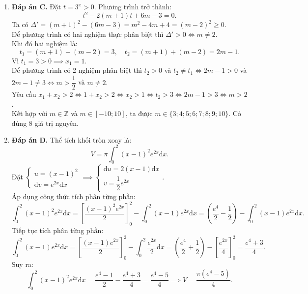 \documentclass[12pt,a4paper]{article}
\begin{document}
\begin{enumerate}[label=\textbf{Câu \arabic*:}, leftmargin=*]
\item \textbf{Đáp án C.}
Đặt $t = 3^x > 0$. Phương trình trở thành:
$$t^2 - 2(m + 1)t + 6m - 3 = 0.$$
Ta có $\Delta' = (m + 1)^2 - (6m - 3) = m^2 - 4m + 4 = (m - 2)^2 \ge 0$.\\
Để phương trình có hai nghiệm thực phân biệt thì $\Delta' > 0 \iff m \ne 2$.\\
Khi đó hai nghiệm là:
$$t_1 = (m + 1) - (m - 2) = 3,\quad t_2 = (m + 1) + (m - 2) = 2m - 1.$$
Vì $t_1 = 3 > 0 \implies x_1 = 1$.\\
Để phương trình có 2 nghiệm phân biệt thì $t_2 > 0$ và $t_2 \ne t_1 \iff 2m - 1 > 0$ và $2m - 1 \ne 3 \iff m > \dfrac{1}{2}$ và $m \ne 2$.\\
Yêu cầu $x_1 + x_2 > 2 \iff 1 + x_2 > 2 \iff x_2 > 1 \iff t_2 > 3 \iff 2m - 1 > 3 \iff m > 2$.\\
Kết hợp với $m \in \mathbb{Z}$ và $m \in [-10; 10]$, ta được $m \in \{3; 4; 5; 6; 7; 8; 9; 10\}$. Có đúng $8$ giá trị nguyên.

\item \textbf{Đáp án D.}
Thể tích khối tròn xoay là:
$$V = \pi \int_0^2 (x - 1)^2 e^{2x} \mathrm{d}x.$$
Đặt $\begin{cases} u = (x - 1)^2 \\ \mathrm{d}v = e^{2x} \mathrm{d}x \end{cases} \implies \begin{cases} \mathrm{d}u = 2(x - 1) \mathrm{d}x \\ v = \dfrac{1}{2} e^{2x} \end{cases}$.\\
Áp dụng công thức tích phân từng phần:
$$\int_0^2 (x - 1)^2 e^{2x} \mathrm{d}x = \left[ \dfrac{(x - 1)^2 e^{2x}}{2} \right]_0^2 - \int_0^2 (x - 1) e^{2x} \mathrm{d}x = \left( \dfrac{e^4}{2} - \dfrac{1}{2} \right) - \int_0^2 (x - 1) e^{2x} \mathrm{d}x.$$
Tiếp tục tích phân từng phần:
$$\int_0^2 (x - 1) e^{2x} \mathrm{d}x = \left[ \dfrac{(x - 1) e^{2x}}{2} \right]_0^2 - \int_0^2 \dfrac{e^{2x}}{2} \mathrm{d}x = \left( \dfrac{e^4}{2} + \dfrac{1}{2} \right) - \left[ \dfrac{e^{2x}}{4} \right]_0^2 = \dfrac{e^4 + 3}{4}.$$
Suy ra:
$$\int_0^2 (x - 1)^2 e^{2x} \mathrm{d}x = \dfrac{e^4 - 1}{2} - \dfrac{e^4 + 3}{4} = \dfrac{e^4 - 5}{4} \implies V = \dfrac{\pi(e^4 - 5)}{4}.$$


\end{enumerate}
\end{document}
